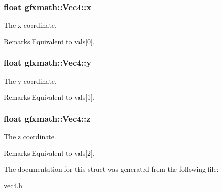 \subsubsection[{x}]{\setlength{\rightskip}{0pt plus 5cm}float gfxmath\+::\+Vec4\+::x}\label{structgfxmath_1_1_vec4_a273598aff75406f0e7a47121b8b06037}


The x coordinate. 

\begin{DoxyRemark}{Remarks}
Equivalent to vals\mbox{[}0\mbox{]}. 
\end{DoxyRemark}
\hypertarget{structgfxmath_1_1_vec4_a95e0ca27d66d7e0223606c20d326b595}{}
\subsubsection[{y}]{\setlength{\rightskip}{0pt plus 5cm}float gfxmath\+::\+Vec4\+::y}\label{structgfxmath_1_1_vec4_a95e0ca27d66d7e0223606c20d326b595}


The y coordinate. 

\begin{DoxyRemark}{Remarks}
Equivalent to vals\mbox{[}1\mbox{]}. 
\end{DoxyRemark}
\hypertarget{structgfxmath_1_1_vec4_acd626b757468a5ea39f98812a36c4419}{}
\subsubsection[{z}]{\setlength{\rightskip}{0pt plus 5cm}float gfxmath\+::\+Vec4\+::z}\label{structgfxmath_1_1_vec4_acd626b757468a5ea39f98812a36c4419}


The z coordinate. 

\begin{DoxyRemark}{Remarks}
Equivalent to vals\mbox{[}2\mbox{]}. 
\end{DoxyRemark}


The documentation for this struct was generated from the following file\+:\begin{DoxyCompactItemize}
\item 
vec4.\+h\end{DoxyCompactItemize}
